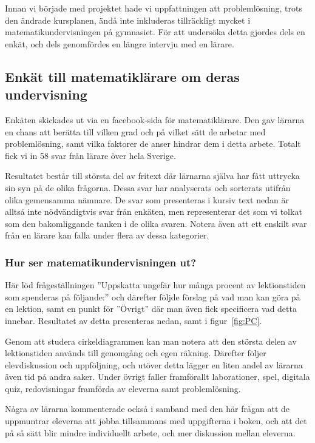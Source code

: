 \textcolor{lila}{Innan vi började med projektet hade vi uppfattningen att problemlösning, trots den ändrade kursplanen, ändå inte inkluderas tillräckligt mycket i matematikundervisningen på gymnasiet. För att undersöka detta gjordes dels en enkät, och dels genomfördes en längre intervju med en lärare.} 

\subsection{Enkät till matematiklärare om deras undervisning}
\label{sec:Bakgrunsenkat}
\textcolor{lila}{Enkäten skickades ut via en facebook-sida för matematiklärare. Den gav lärarna en chans att berätta till vilken grad och på vilket sätt de arbetar med problemlösning, samt vilka faktorer de anser hindrar dem i detta arbete. Totalt fick vi in 58 svar från lärare över hela Sverige.}

\textcolor{lila}{Resultatet består till största del av fritext där lärnarna själva har fått uttrycka sin syn på de olika frågorna. Dessa svar har analyserats och sorterats utifrån olika gemensamma nämnare. De svar som presenteras i kursiv text nedan är alltså inte nödvändigtvis svar från enkäten, men representerar det som vi tolkat som den bakomliggande tanken i de olika svaren. Notera även att ett enskilt svar från en lärare kan falla under flera av dessa kategorier.}

\subsubsection{Hur ser matematikundervisningen ut?}

\textcolor{lila}{Här löd frågeställningen ''Uppskatta ungefär hur många procent av lektionstiden som spenderas på följande:'' och därefter följde förslag på vad man kan göra på en lektion, samt en punkt för ''Övrigt'' där man även fick specificera vad detta innebar. Resultatet av detta presenteras nedan, samt i figur~\ref{fig:PC}.}



\textcolor{lila}{Genom att studera cirkeldiagrammen kan man notera att den största delen av lektionstiden används till genomgång och egen räkning. Därefter följer elevdiskussion och uppföljning, och utöver detta lägger en liten andel av lärarna även tid på andra saker. Under övrigt faller framförallt laborationer, spel, digitala quiz, redovisningar framförda av eleverna samt problemlösning.}

\textcolor{lila}{Några av lärarna kommenterade också i samband med den här frågan att de uppmuntrar eleverna att jobba tillsammans med uppgifterna i boken, och att det på så sätt blir mindre individuellt arbete, och mer diskussion mellan eleverna.}

